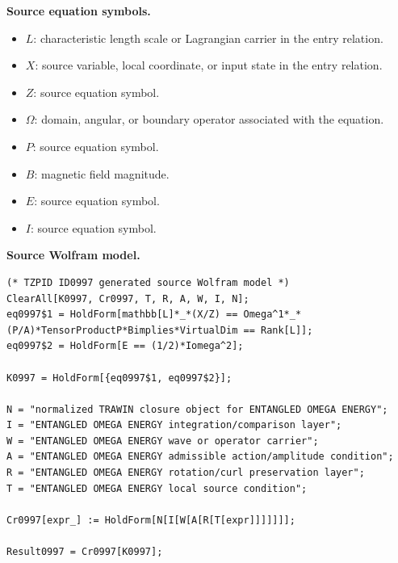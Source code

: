 \begin{minipage}[t]{0.49\linewidth}
\begingroup
\small
\raggedright
\textbf{Source equation symbols.}\par
\begin{itemize}[leftmargin=1.35em,itemsep=1pt,topsep=1pt,parsep=0pt]
    \item $L$: characteristic length scale or Lagrangian carrier in the entry relation.
    \item $X$: source variable, local coordinate, or input state in the entry relation.
    \item $Z$: source equation symbol.
    \item $\Omega$: domain, angular, or boundary operator associated with the equation.
    \item $P$: source equation symbol.
    \item $B$: magnetic field magnitude.
    \item $E$: source equation symbol.
    \item $I$: source equation symbol.
\end{itemize}
\endgroup
\end{minipage}\hfill
\begin{minipage}[t]{0.47\linewidth}
\begingroup
\scriptsize
\raggedright
\textbf{Source Wolfram model.}\par
\begin{Verbatim}[fontsize=\tiny,breaklines=true,breakanywhere=true]
(* TZPID ID0997 generated source Wolfram model *)
ClearAll[K0997, Cr0997, T, R, A, W, I, N];
eq0997$1 = HoldForm[mathbb[L]*_*(X/Z) == Omega^1*_*(P/A)*TensorProductP*Bimplies*VirtualDim == Rank[L]];
eq0997$2 = HoldForm[E == (1/2)*Iomega^2];

K0997 = HoldForm[{eq0997$1, eq0997$2}];

N = "normalized TRAWIN closure object for ENTANGLED OMEGA ENERGY";
I = "ENTANGLED OMEGA ENERGY integration/comparison layer";
W = "ENTANGLED OMEGA ENERGY wave or operator carrier";
A = "ENTANGLED OMEGA ENERGY admissible action/amplitude condition";
R = "ENTANGLED OMEGA ENERGY rotation/curl preservation layer";
T = "ENTANGLED OMEGA ENERGY local source condition";

Cr0997[expr_] := HoldForm[N[I[W[A[R[T[expr]]]]]]];

Result0997 = Cr0997[K0997];
\end{Verbatim}
\endgroup
\end{minipage}

